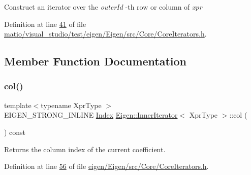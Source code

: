 Construct an iterator over the {\itshape outer\+Id} -\/th row or column of {\itshape xpr} 

Definition at line \hyperlink{matio_2visual__studio_2test_2eigen_2_eigen_2src_2_core_2_core_iterators_8h_source_l00041}{41} of file \hyperlink{matio_2visual__studio_2test_2eigen_2_eigen_2src_2_core_2_core_iterators_8h_source}{matio/visual\+\_\+studio/test/eigen/\+Eigen/src/\+Core/\+Core\+Iterators.\+h}.



\subsection{Member Function Documentation}
\mbox{\label{class_eigen_1_1_inner_iterator_a1d2ccb720e90bc6928064cc30c41fb93}} 
\subsubsection{\texorpdfstring{col()}{col()}\hspace{0.1cm}{\footnotesize\ttfamily [1/2]}}
{\footnotesize\ttfamily template$<$typename Xpr\+Type $>$ \\
E\+I\+G\+E\+N\+\_\+\+S\+T\+R\+O\+N\+G\+\_\+\+I\+N\+L\+I\+NE \hyperlink{namespace_eigen_a62e77e0933482dafde8fe197d9a2cfde}{Index} \hyperlink{class_eigen_1_1_inner_iterator}{Eigen\+::\+Inner\+Iterator}$<$ Xpr\+Type $>$\+::col (\begin{DoxyParamCaption}{ }\end{DoxyParamCaption}) const\hspace{0.3cm}{\ttfamily [inline]}}

\begin{DoxyReturn}{Returns}
the column index of the current coefficient. 
\end{DoxyReturn}


Definition at line \hyperlink{eigen_2_eigen_2src_2_core_2_core_iterators_8h_source_l00056}{56} of file \hyperlink{eigen_2_eigen_2src_2_core_2_core_iterators_8h_source}{eigen/\+Eigen/src/\+Core/\+Core\+Iterators.\+h}.

\mbox{\label{class_eigen_1_1_inner_iterator_a1d2ccb720e90bc6928064cc30c41fb93}} 
